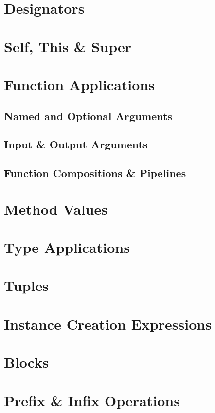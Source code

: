 \section{Designators}

\section{Self, This \& Super}

\section{Function Applications}

\subsection{Named and Optional Arguments}

\subsection{Input \& Output Arguments}

\subsection{Function Compositions \& Pipelines}

\section{Method Values}

\section{Type Applications}

\section{Tuples}

\section{Instance Creation Expressions}

\section{Blocks}

\section{Prefix \& Infix Operations}

